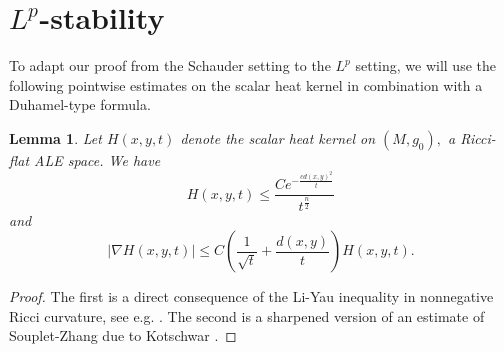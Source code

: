 \documentclass[12pt]{amsart}
\newcommand{\calM}{\mathcal{M}}
\renewcommand{\1}{{\mathbf 1}}
\newcommand{\eps}{{\varepsilon}}
\newtheorem{lemma}[thm]{Lemma}
\theoremstyle{others}
\numberwithin{equation}{section}
\begin{document}
    

\vspace{10mm}


\section{$L^p$-stability}\label{sec:Lpstability} %


To adapt our proof from the Schauder setting to the $L^p$ setting, we will use the following pointwise estimates on the scalar heat kernel in combination with a Duhamel-type formula. %



\begin{lemma}\label{lemma:heatkernelest}
    Let $H(x,y,t)$ denote the scalar heat kernel on $(M, g_0),$ a Ricci-flat ALE space. We have
    \begin{equation}\label{heatkernelest}
        H(x,y,t) \leq \frac{Ce^{-\frac{c d(x,y)^2}{t}} }{t^{\frac{n}{2}}} 
    \end{equation}
    and
    \begin{equation}\label{Kotschwar}
        \left| \nabla H(x,y,t) \right| \leq C \left( \frac1{\sqrt t} + \frac{d(x,y)}{t} \right)  H(x,y,t). 
    \end{equation}
\end{lemma}
\begin{proof}
    The first is a direct consequence of the Li-Yau inequality in nonnegative Ricci curvature, see e.g. \cite[Theorem 13.4]{LiBook}. The second is a sharpened version of an estimate of Souplet-Zhang \cite{SoupletZhang06} %
    due to Kotschwar \cite{Kotschwar07}.%
\end{proof}
\end{document}
